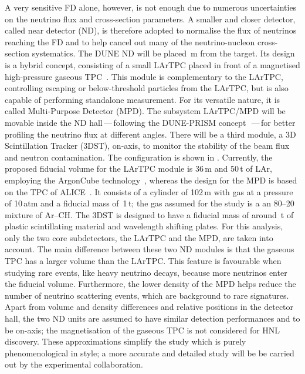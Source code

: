 A very sensitive FD alone, however, is not enough due to numerous uncertainties on the neutrino flux and cross-section parameters.
A smaller and closer detector, called near detector (ND), is therefore adopted to normalise %
the flux of neutrinos reaching the FD and to help cancel out many of the neutrino-nucleon cross-section systematics.
The DUNE ND will be placed \,m from the target.
Its design is a hybrid concept, consisting of a small LArTPC placed in front of a magnetised high-pressure gaseous TPC~\cite{Abi:2020wmh}.
This module is complementary to the LArTPC, controlling escaping or below-threshold particles from the LArTPC, %
but is also capable of performing standalone measurement.
For its versatile nature, it is called Multi-Purpose Detector (MPD).
The subsystem LArTPC/MPD will be movable inside the ND hall\,---\,following the DUNE-PRISM concept~\cite{Abi:2020wmh}\,---\,for %
better profiling the neutrino flux at different angles.
There will be a third module, a 3D Scintillation Tracker (3DST), on-axis, to monitor %
the stability of the beam flux and neutron contamination.
The configuration is shown in .
Currently, the proposed fiducial volume for the LArTPC module is 36\,m and 50\,t of LAr, %
employing the ArgonCube technology~\cite{Asaadi:2018xfh}, %
whereas the design for the MPD is based on the TPC of \mbox{ALICE}~\cite{Glassel:2004jv}.
It consists of a cylinder of 102\,m with gas at a pressure of 10\,atm and a fiducial mass of~1\,t; %
the gas assumed for the study is a an 80--20 mixture of Ar--CH.
The 3DST is designed to have a fiducial mass of around \,t of plastic scintillating material and %
wavelength shifting plates.
For this analysis, only the two core subdetectors, the LArTPC and the MPD, are taken into account.
The main difference between these two ND modules is that the gaseous TPC has a larger volume than the LArTPC.
This feature is favourable when studying rare events, like heavy neutrino decays, because more neutrinos enter the fiducial volume.
Furthermore, the lower density of the MPD helps reduce the number of neutrino scattering events, which are background to rare signatures.
Apart from volume and density differences and relative positions in the detector hall, %
the two ND units are assumed to have similar detection performances and to be on-axis; %
the magnetisation of the gaseous TPC is not considered for HNL discovery.
These approximations simplify the study which is purely phenomenological in style; %
a more accurate and detailed study will be be carried out by the experimental collaboration. 

